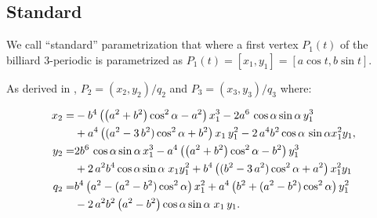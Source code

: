 \subsection{Standard}
\label{sec:03-confocal-standard-param}

We call ``standard'' parametrization that where a first vertex $P_1(t)$ of the billiard 3-periodic is parametrized as $P_1(t)=[x_1,y_1]=[a\cos{t},b\sin{t}]$.

As derived in \cite{garcia2019-incenter}, $P_2=(x_2,y_2)/q_2$ and $P_3=(x_3,y_3)/q_3$ where:

 \begin{equation}\label{eq:03-p2} \aligned 
x_{2}=&-{b}^{4} \left(  \left(   a^2+{b}^{2}\right)\cos^{2}\alpha   -{a}^{2}  \right) x_1^{3}-2{a}^{6} \,\cos  \alpha  \sin   \alpha  \, y_1^{3}\\
&+{a}^{4} \left(  ({a
}^{2}-3\, {b}^{2}) \cos^{2} \alpha  +{b}^{2}
 \right) {x_1}\,y_1^{2}-2\,{a}^{4}{b}^{2} \cos \alpha  \,\sin  \alpha    x_1^{2}{y_1},
\\
y_{2}=& 2{b}^{6} \,\cos \alpha\sin \alpha\,   x_1^{3}-{
a}^{4}  \left(  \left(   a^2+{b}^{2}\right)\cos^{2}  \alpha  -{b}^{2}  \right)  y_1^{3}\\
&+  2\,{a}^{2} {b}^{4}\cos \alpha \sin
  \alpha \; {x_1} y_1^{2} +{b}^{4}\left(  ({b
 }^{2}-3\, {a}^{2}) \cos^{2} \alpha  +{a}^{2}
  \right) x_1^{2}{y_1}
\\
q_2=&{b}^{4} \left( a^2-(a^2-b^2)\cos^2  \alpha   \right)
x_1^{2}+{a}^{4} \left(  {b}^{2}+(a^2-b^2)\cos^2 \alpha  
 \right) y_1^{2}\\
 & - 2\, {a}^{2}{b}^{2} \left({a}^{2} -{b}^{2} \right)\cos \alpha\sin \alpha \; {x_1}\,{
y_1}.
\endaligned
%
\end{equation}


